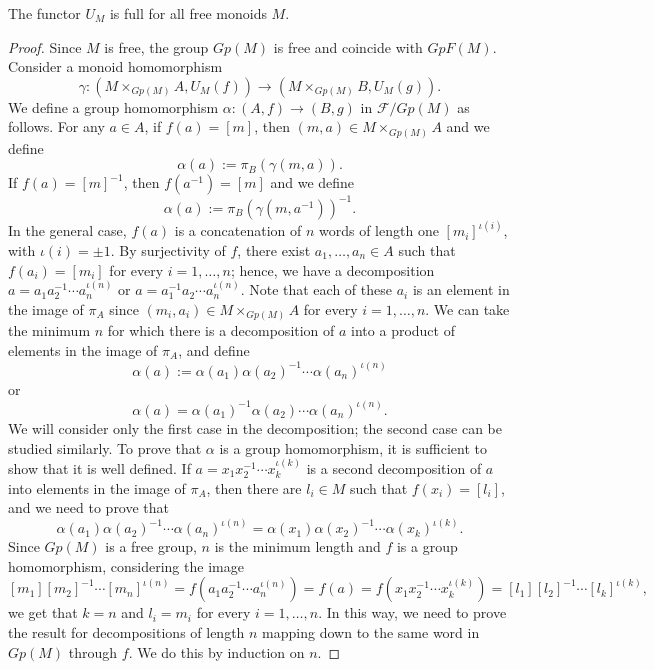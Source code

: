 \begin{lemma}
\label{lem:AdmissibilityFullFree}
    The functor $U_M$ is full for all free monoids $M$.
    \begin{proof}
        Since $M$ is free, the group $Gp(M)$ is free and coincide with $GpF(M)$. Consider a monoid homomorphism
        \[ \gamma:(M\times_{Gp(M)}A, U_M(f))\longrightarrow (M\times_{Gp(M)}B, U_M(g)). \]
        We define a group homomorphism $\alpha:(A,f)\rightarrow(B,g)$ in $\mathscr{F}/Gp(M)$ as follows. For any $a\in A$, if $f(a)=[m]$, then $(m,a)\in M\times_{Gp(M)}A$ and we define
        \[ \alpha(a) := \pi_B(\gamma(m,a)). \]
        If $f(a)=[m]^{-1}$, then $f(a^{-1})=[m]$ and we define
        \[ \alpha(a) := \pi_B(\gamma(m,a^{-1}))^{-1}. \]
        In the general case, $f(a)$ is a concatenation of $n$ words of length one $[m_i]^{\iota(i)}$, with $\iota(i)=\pm1$. By surjectivity of $f$, there exist $a_1,\dots, a_n\in A$ such that $f(a_i)=[m_i]$ for every $i=1,\dots, n$; hence, we have a decomposition $a = a_1a_2^{-1}\cdots a_n^{\iota(n)}$ or $a=a_1^{-1}a_2\cdots a_n^{\iota(n)}$. Note that each of these $a_i$ is an element in the image of $\pi_A$ since $(m_i,a_i)\in M\times_{Gp(M)}A$ for every $i=1,\dots, n$. We can take the minimum $n$ for which there is a decomposition of $a$ into a product of elements in the image of $\pi_A$, and define
        \[ \alpha(a) := \alpha(a_1)\alpha(a_2)^{-1}\cdots\alpha(a_n)^{\iota(n)} \]
        or
        \[ \alpha(a) = \alpha(a_1)^{-1}\alpha(a_2)\cdots\alpha(a_n)^{\iota(n)}. \]
        We will consider only the first case in the decomposition; the second case can be studied similarly. To prove that $\alpha$ is a group homomorphism, it is sufficient to show that it is well defined. If $a=x_1x_2^{-1}\cdots x_k^{\iota(k)}$ is a second decomposition of $a$ into elements in the image of $\pi_A$, then there are $l_i\in M$ such that $f(x_i)=[l_i]$, and we need to prove that
        \[ \alpha(a_1)\alpha(a_2)^{-1}\cdots\alpha(a_n)^{\iota(n)} = \alpha(x_1)\alpha(x_2)^{-1}\cdots\alpha(x_k)^{\iota(k)}. \]
        Since $Gp(M)$ is a free group, $n$ is the minimum length and $f$ is a group homomorphism, considering the image
        \[ [m_1][m_2]^{-1}\cdots[m_n]^{\iota(n)}=f(a_1a_2^{-1}\cdots a_n^{\iota(n)})=f(a)=f(x_1x_2^{-1}\cdots x_k^{\iota(k)})=[l_1][l_2]^{-1}\cdots[l_k]^{\iota(k)}, \]
        we get that $k=n$ and $l_i=m_i$ for every $i=1,\dots,n$. In this way, we need to prove the result for decompositions of length $n$ mapping down to the same word in $Gp(M)$ through $f$. We do this by induction on $n$.


\end{proof}
\end{lemma}
